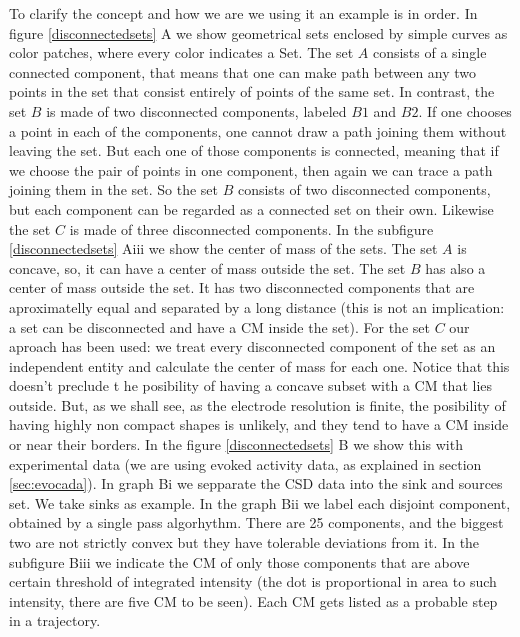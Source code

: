 \documentclass[12pt]{article}
\begin{document}
To clarify the concept and how we are we using it an example is in order. In figure \ref{disconnectedsets} A we show geometrical sets enclosed by simple curves as color patches, where every color indicates a Set. The set $A$ consists of a single connected component, that means that one can make  path between any two points in the set that consist entirely of points of the same set. In contrast, the set $B$ is made of two disconnected components, labeled $B1$ and $B2$. If one chooses a point in each of the components, one cannot draw a path joining them without leaving the set. But each one of those components is connected, meaning that if we choose the pair of points in one component, then again we can trace a path joining them in the set. So the set $B$ consists of two disconnected components, but each component can be regarded as a connected set on their own. Likewise the set $C$ is made of three disconnected components. In the subfigure \ref{disconnectedsets} Aiii we show the center of mass of the sets. The set $A$ is concave, so, it can have a center of mass outside the set. The
set $B$ has also a center of mass outside the set. It has two disconnected components that are aproximatelly
equal and separated by a long distance (this is not an implication: a set can be disconnected and have
a CM inside the set). For the set $C$ our aproach has been used: we treat every disconnected component of the
set as an independent entity and calculate the center of mass for each one. Notice that this doesn't preclude t
he posibility of having a concave subset with a CM that lies outside. But, as we shall see,
as the electrode resolution is finite, the posibility of having highly non compact shapes is unlikely, and they
tend to have a CM inside or near their borders. In the figure \ref{disconnectedsets} B we show this with experimental
data (we are using evoked activity data, as explained in section \ref{sec:evocada}). In graph Bi we
sepparate the CSD data into the sink and sources set. We take sinks as example. In the graph Bii
we label each disjoint component, obtained by a single pass algorhythm. There are 25 components, and
the biggest two are not strictly convex but they have tolerable deviations from it. In the
subfigure Biii we indicate the CM of only those components that are above certain threshold of
integrated intensity (the dot is proportional in area to such intensity, there are five CM to be
seen). Each CM gets listed as a probable step in a trajectory.
\end{document}
